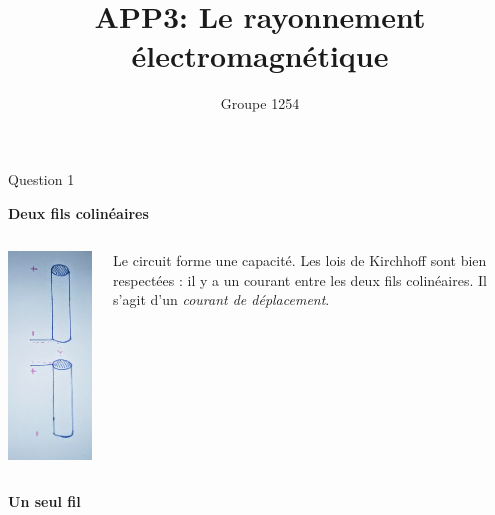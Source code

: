 \documentclass{beamer}
\title{APP3: Le rayonnement électromagnétique}
\author{Groupe 1254}
\begin{document}
\begin{frame}
	\maketitle
\end{frame}

\begin{frame}{Question 1}
    \begin{center}\textbf{Deux fils colinéaires}\end{center}
	\begin{columns}
		\begin{column}{0.40\textwidth}
			\begin{center}
	    		\includegraphics[scale=0.3, angle=90]{question1.png}
    		\end{center}
    	\end{column}
    	\begin{column}{0.40\textwidth}
	Le circuit forme une capacité.
	Les lois de Kirchhoff sont bien respectées : il y a un courant entre les deux fils colinéaires. Il s'agit d'un \emph{courant de déplacement}.
    	\end{column}
	\end{columns}
    \begin{center}\textbf{Un seul fil}\end{center}

\end{frame}
\end{document}
